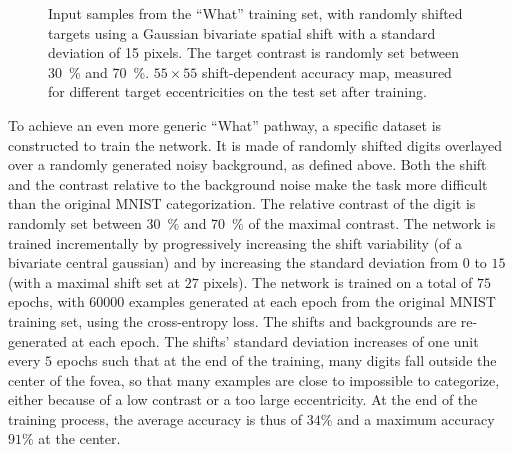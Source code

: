\begin{figure}[t!]%
	\caption{\A Input samples from the ``What'' training set, with  randomly shifted targets using a Gaussian bivariate spatial shift with a standard deviation of 15 pixels. The target contrast is randomly set between 30~\% and 70~\%.
	\B $55 \times 55$ shift-dependent accuracy map, measured for different target eccentricities on the test set after training.
	}
\label{fig:accuracy}
\end{figure}
To achieve an even more generic ``What'' pathway, a specific dataset is constructed to train the network. It is made of randomly shifted digits overlayed over a randomly generated noisy background, as defined above. Both the shift and the contrast relative to the background noise make the task more difficult than the original MNIST categorization. The relative contrast of the digit is randomly set between 30~\% and 70~\% of the maximal contrast.  The network is trained incrementally by progressively increasing the shift variability (of a bivariate central gaussian) and by increasing the standard deviation from $0$ to $15$ (with a maximal shift set at $27$ pixels). The network is trained on a total of $75$ epochs, with $60000$ examples generated at each epoch from the original MNIST training set, using the cross-entropy loss. The shifts and backgrounds are re-generated at each epoch. The shifts' standard deviation increases of one unit every $5$ epochs such that at the end of the training, many digits fall outside the center of the fovea, so that many examples are close to impossible to categorize, either because of a low contrast or a too large eccentricity. At the end of the training process, the average accuracy is thus of $34\%$ and a maximum accuracy $91\%$ at the center.

